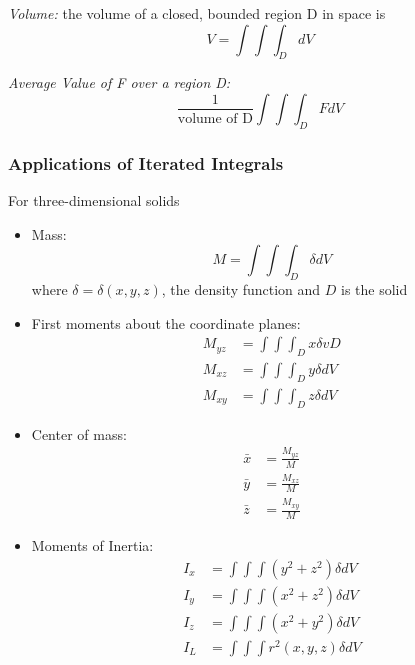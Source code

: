 \documentclass[12pt]{article}
\begin{document}
\emph{Volume:} the volume of a closed, bounded region D in space is 
\[V = \int \int \int_D dV\]

\emph{Average Value of F over a region D:} 
\[\frac{1}{\text{volume of D}} \int \int \int_D F dV\]

\subsubsection{Applications of Iterated Integrals}
For three-dimensional solids
\begin{itemize}
    \item Mass:
    \[M = \int \int \int_D \delta dV\]
    where $\delta = \delta(x,y,z)$, the density function and $D$ is the solid 
    \item First moments about the coordinate planes:
    \begin{align*}
        M_{yz} &= \int \int \int_D x\delta vD\\
        M_{xz} &= \int \int \int_D y\delta dV\\
        M_{xy} &= \int \int \int_D z \delta dV
    \end{align*}
    \item Center of mass:
    \begin{align*}
        \bar{x} &= \frac{M_{yz}}{M}\\
        \bar{y} &= \frac{M_{xz}}{M}\\
        \bar{z} &= \frac{M_{xy}}{M}
    \end{align*}
    \item Moments of Inertia:
    \begin{align*}
        I_x &= \int \int \int (y^2 + z^2) \delta dV\\
        I_y &= \int \int \int (x^2 + z^2) \delta dV\\
        I_z &= \int \int \int (x^2 + y^2) \delta dV\\
        I_L &= \int \int \int r^2 (x,y,z) \delta dV\\
    \end{align*}
\end{itemize}
\end{document}
